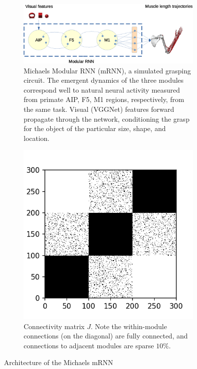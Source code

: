 \documentclass[12pt]{iopart}
\begin{document}
\begin{figure}
	\centering
	\begin{subfigure}[c]{0.69\textwidth}
		\centering
		\includegraphics[width=\textwidth]{michaels.eps}
		\caption{Michaels Modular RNN (mRNN), a simulated grasping circuit. The emergent dynamics of the
		three modules correspond well to natural neural activity measured from primate AIP, F5, M1 regions,
		respectively, from the same task. Visual (VGGNet) features forward propagate through the
		network, conditioning the grasp for the object of the particular size, shape, and location.}
	\end{subfigure}
	\hfill
	\begin{subfigure}[c]{0.30\textwidth}
		\centering
		\includegraphics[width=\textwidth]{mRNN_J.png}
		\caption{Connectivity matrix $J$. Note the within-module connections
		(on the diagonal) are fully connected, and connections to adjacent
		modules are sparse $10\%$.}
	\end{subfigure}
	\hfill
\caption{Architecture of the Michaels mRNN}
\label{fig:michaels}
\end{figure}
\end{document}
